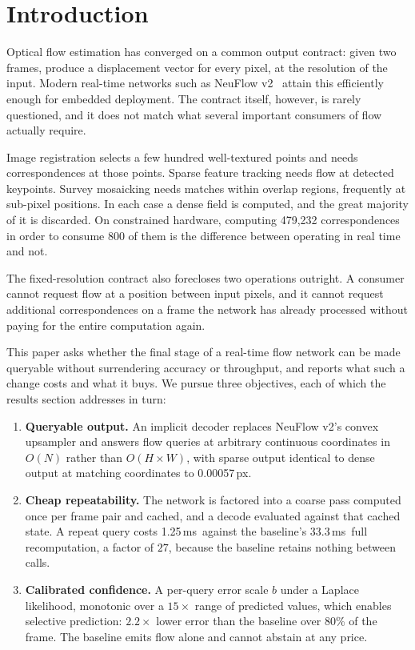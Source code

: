 \documentclass[conference]{IEEEtran}
\newcommand{\px}{\,px}
\newcommand{\ms}{\,ms}
\begin{document}
\section{Introduction}

Optical flow estimation has converged on a common output contract: given two
frames, produce a displacement vector for every pixel, at the resolution of the
input. Modern real-time networks such as NeuFlow v2~\cite{neuflow2} attain this
efficiently enough for embedded deployment. The contract itself, however, is
rarely questioned, and it does not match what several important consumers of
flow actually require.

Image registration selects a few hundred well-textured points and needs
correspondences at those points. Sparse feature tracking needs flow at detected
keypoints. Survey mosaicking needs matches within overlap regions, frequently at
sub-pixel positions. In each case a dense field is computed, and the great
majority of it is discarded. On constrained hardware, computing 479{,}232
correspondences in order to consume 800 of them is the difference between
operating in real time and not.

The fixed-resolution contract also forecloses two operations outright. A
consumer cannot request flow at a position between input pixels, and it cannot
request additional correspondences on a frame the network has already processed
without paying for the entire computation again.

This paper asks whether the final stage of a real-time flow network can be made
queryable without surrendering accuracy or throughput, and reports what such a
change costs and what it buys. We pursue three objectives, each of which the
results section addresses in turn:

\begin{enumerate}
\item \textbf{Queryable output.} An implicit decoder replaces NeuFlow v2's convex
      upsampler and answers flow queries at arbitrary continuous coordinates in
      $O(N)$ rather than $O(H{\times}W)$, with sparse output identical to dense
      output at matching coordinates to 0.00057\px.
\item \textbf{Cheap repeatability.} The network is factored into a coarse pass
      computed once per frame pair and cached, and a decode evaluated against
      that cached state. A repeat query costs 1.25\ms\ against the baseline's
      33.3\ms\ full recomputation, a factor of $27$, because the baseline retains
      nothing between calls.
\item \textbf{Calibrated confidence.} A per-query error scale $b$ under a Laplace
      likelihood, monotonic over a $15\times$ range of predicted values, which
      enables selective prediction: $2.2\times$ lower error than the baseline
      over 80\% of the frame. The baseline emits flow alone and cannot abstain at
      any price.
\end{enumerate}
\end{document}
